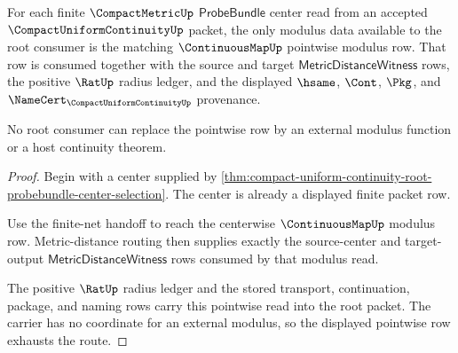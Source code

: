 \begin{theorem}
\label{thm:compact-uniform-continuity-root-pointwise-modulus-row}
For each finite $\CompactMetricUp$ $\mathsf{ProbeBundle}$ center read from an accepted $\CompactUniformContinuityUp$ packet, the only modulus data available to the root consumer is the matching $\ContinuousMapUp$ pointwise modulus row. That row is consumed together with the source and target $\mathsf{MetricDistanceWitness}$ rows, the positive $\RatUp$ radius ledger, and the displayed $\hsame$, $\Cont$, $\Pkg$, and $\NameCert_{\CompactUniformContinuityUp}$ provenance.

No root consumer can replace the pointwise row by an external modulus function or a host continuity theorem.
\end{theorem}
\begin{proof}
Begin with a center supplied by \autoref{thm:compact-uniform-continuity-root-probebundle-center-selection}. The center is already a displayed finite packet row.

Use the finite-net handoff to reach the centerwise $\ContinuousMapUp$ modulus row. Metric-distance routing then supplies exactly the source-center and target-output $\mathsf{MetricDistanceWitness}$ rows consumed by that modulus read.

The positive $\RatUp$ radius ledger and the stored transport, continuation, package, and naming rows carry this pointwise read into the root packet. The carrier has no coordinate for an external modulus, so the displayed pointwise row exhausts the route.
\end{proof}

